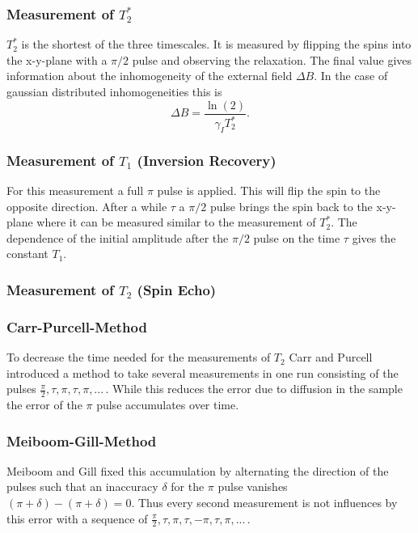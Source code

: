 \documentclass[a4paper]{scrartcl}
\numberwithin{equation}{section}
\numberwithin{figure}{section}
\numberwithin{table}{section}
\newcommand{\eq}[2]{\begin{equation}#1\label{#2}\end{equation}}
\begin{document}
\subsubsection*{Measurement of $T_2^*$}
$T_2^*$ is the shortest of the three timescales. It is measured by flipping the spins into the x-y-plane with a $\pi/2$ pulse and observing the relaxation. The final value gives information about the inhomogeneity of the external field ${\Delta B}$. In the case of gaussian distributed inhomogeneities this is
\eq{{\Delta B} = \frac{\ln(2)}{\gamma_I T_2^*} .}{}

\subsubsection*{Measurement of $T_1$ (Inversion Recovery)}
For this measurement a full $\pi$ pulse is applied. This will flip the spin to the opposite direction. After a while $\tau$ a $\pi/2$ pulse brings the spin back to the x-y-plane where it can be measured similar to the measurement of $T_2^*$. The dependence of the initial amplitude after the $\pi/2$ pulse on the time $\tau$ gives the constant $T_1$.

\subsubsection*{Measurement of $T_2$ (Spin Echo)}


\subsubsection*{Carr-Purcell-Method}
To decrease the time needed for the measurements of $T_2$ Carr and Purcell introduced a method to take several measurements in one run consisting of the pulses $\frac{\pi}{2},\tau,\pi,\tau,\pi,...\,$. While this reduces the error due to diffusion in the sample the error of the $\pi$ pulse accumulates over time.

\subsubsection*{Meiboom-Gill-Method}
Meiboom and Gill fixed this accumulation by alternating the direction of the pulses such that an inaccuracy $\delta$ for the $\pi$ pulse vanishes $(\pi+\delta)-(\pi+\delta)=0$. Thus every second measurement is not influences by this error with a sequence of $\frac{\pi}{2},\tau,\pi,\tau,-\pi,\tau,\pi,...\,$.


\FloatBarrier
\clearpage
 

\end{document}
